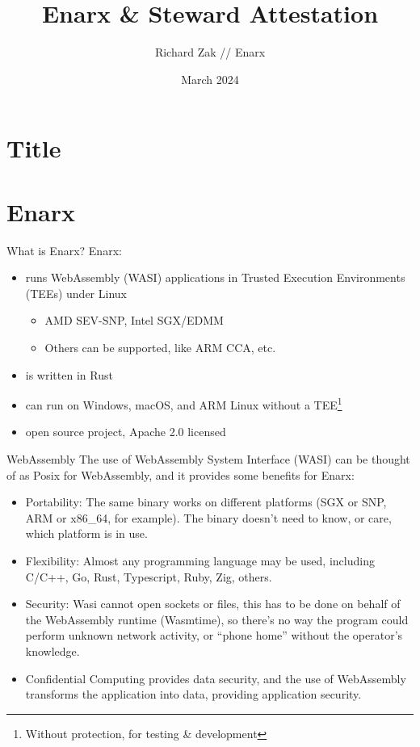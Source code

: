 \documentclass[graphics,compress]{beamer}
\title{Enarx \& Steward Attestation}
\author{Richard Zak // Enarx}
\date{March 2024}
\begin{document}
\section*{Title}
\begin{frame}
\maketitle
\end{frame}

\frame{\tableofcontents}

\section{Enarx}
\begin{frame}{What is Enarx?}
        Enarx:
        \begin{itemize}
        \item runs WebAssembly (WASI) applications in Trusted Execution Environments (TEEs) under Linux
        \begin{itemize}
        \item AMD SEV-SNP, Intel SGX/EDMM
        \item Others can be supported, like ARM CCA, etc.
        \end{itemize}
        \item is written in Rust
        \item can run on Windows, macOS, and ARM Linux without a TEE\footnote{Without protection, for testing \& development}
        \item open source project, Apache 2.0 licensed
        \end{itemize}
\end{frame}

\begin{frame}{WebAssembly}
    The use of WebAssembly System Interface (WASI) can be thought of as Posix for WebAssembly, and it provides some benefits for Enarx:
    \begin{itemize}
        \item Portability: The same binary works on different platforms (SGX or SNP, ARM or x86\_64, for example). The binary doesn't need to know, or care, which platform is in use.
        \item Flexibility: Almost any programming language may be used, including C/C++, Go, Rust, Typescript, Ruby, Zig, others.
        \item Security: Wasi cannot open sockets or files, this has to be done on behalf of the WebAssembly runtime (Wasmtime), so there's no way the program could perform unknown network activity, or ``phone home'' without the operator's knowledge.
        \item Confidential Computing provides data security, and the use of WebAssembly transforms the application into data, providing application security.
    \end{itemize}
\end{frame}
\end{document}
